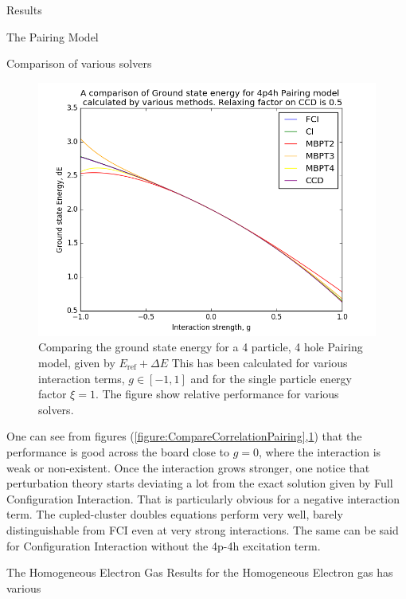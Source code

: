 \documentclass[twoside,english]{uiofysmaster}
\begin{document}
\begin{chapter}{Results}
\begin{section}{The Pairing Model}
\begin{subsection}{Comparison of various solvers}
			\begin{figure}[H]
				\includegraphics[width=\linewidth]{../Pairing_Model/Results/Figures/Pairing4p4h_CompareE_AllMethods.png}
				\caption{Comparing the ground state energy for a 4 particle, 4 hole Pairing model, given by $E_{\text{ref}} + \Delta E$ This has been calculated for various interaction terms, $g \in [-1,1]$ and for the single particle energy factor $\xi = 1$. The figure show relative performance for various solvers.}
				\label{figure:CompareEnergyPairing}
			\end{figure}
			One can see from figures (\ref{figure:CompareCorrelationPairing},\ref{figure:CompareEnergyPairing}) that the performance is good across the board close to $g = 0$, where the interaction is weak or non-existent. Once the interaction grows stronger, one notice that perturbation theory starts deviating a lot from the exact solution given by Full Configuration Interaction. That is particularly obvious for a negative interaction term. The cupled-cluster doubles equations perform very well, barely distinguishable from FCI even at very strong interactions. The same can be said for Configuration Interaction without the 4p-4h excitation term.  
		\end{subsection}

	\end{section}

	\newpage

	\begin{section}{The Homogeneous Electron Gas}
		Results for the Homogeneous Electron gas has various 


\end{section}
\end{chapter}
\end{document}
